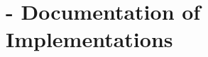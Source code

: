 % 
%               
%          
% 
\chapter{\texorpdfstring{\protect\marktool{\toolnameshort}}{\toolnameshort} - Documentation of Implementations}
\setcounter{currentlevel}{6}




\newpage


\newpage

